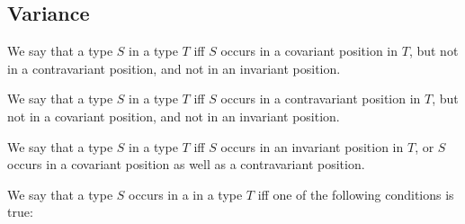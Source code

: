 \documentclass[makeidx]{article}
\begin{document}





\subsection{Variance}

\LMHash{}%
We say that a type $S$  in a type $T$ if{}f
$S$ occurs in a covariant position in $T$,
but not in a contravariant position,
and not in an invariant position.

\LMHash{}%
We say that a type $S$  in a type $T$ if{}f
$S$ occurs in a contravariant position in $T$,
but not in a covariant position,
and not in an invariant position.

\LMHash{}%
We say that a type $S$  in a type $T$ if{}f
$S$ occurs in an invariant position in $T$,
or $S$ occurs in a covariant position as well as a contravariant position.

\LMHash{}%
We say that a type $S$ occurs in a  in a type $T$
if{}f one of the following conditions is true:
\end{document}
